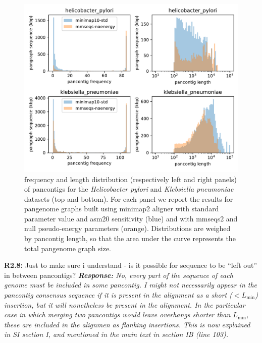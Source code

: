 \documentclass[aps,rmp,onecolumn]{revtex4-1}
\newcommand{\Lthr}{L_{\min}}
\newcommand{\Marco}[1]{{\color{gray}Marco: #1}}
\newcommand{\Liam}[1]{{\color{teal}Liam: #1}}
\newcommand{\reviewer}[2]{\textbf{#1:} #2\vskip 5mm}
\newcommand{\response}[1]{{\it {\color{response}\textbf{Response:} #1}}\vskip 5mm}
\begin{document}
\begin{figure}[htb]
      \includegraphics[width=.7\textwidth]{figs_response/hp_vs_kp.pdf}
      \caption{frequency and length distribution (respectively left and right panels) of pancontigs for the \textit{Helicobacter pylori} and \textit{Klebsiella pneumoniae} datasets (top and bottom). For each panel we report the results for pangenome graphs built using minimap2 aligner with standard parameter value and asm20 sensitivity (blue) and with mmseqs2 and null pseudo-energy parameters (orange). Distributions are weighed by pancontig length, so that the area under the curve represents the total pangenome graph size.}
      \label{fig:kp-vs-hp}
\end{figure}

\reviewer{R2.8}{Just to make sure i understand - is it possible for sequence to be ``left out'' in between pancontigs?}
\response{No, every part of the sequence of each genome must be included in some pancontig. I might not necessarily appear in the pancontig consensus sequence if it is present in the alignment as a short ($< \Lthr$) insertion, but it will nonetheless be present in the alignment. In the particular case in which merging two pancontigs would leave overhangs shorter than $\Lthr$, these are included in the alignmen as flanking insertions. This is now explained in SI section I, and mentioned in the main text in section IB (line 103).}
\end{document}
